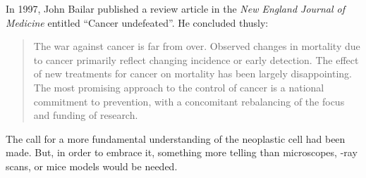 
\medskip

In 1997, John Bailar published a review article in the \emph{New England Journal
  of Medicine} entitled ``Cancer undefeated''.\cite{bailar_cancer_1997} He
concluded thusly:

\begin{quotation}
  The war against cancer is far from over.  Observed changes in mortality due to
  cancer primarily reflect changing incidence or early detection.  The effect of
  new treatments for cancer on mortality has been largely disappointing.  The
  most promising approach to the control of cancer is a national commitment to
  prevention, with a concomitant rebalancing of the focus and funding of
  research.
\end{quotation}

The call for a more fundamental understanding of the neoplastic cell had been
made. But, in order to embrace it, something more telling than microscopes,
-ray scans, or mice models would be needed.

\clearpage






